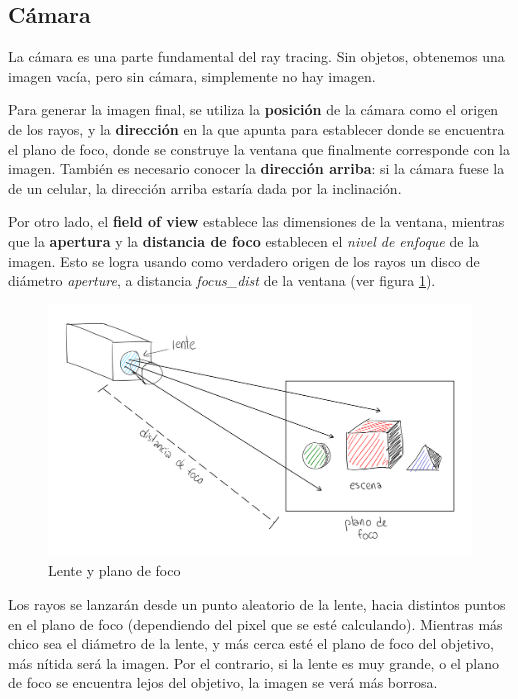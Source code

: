 \subsection{Cámara} \label{ssec:rt-camera}

La cámara es una parte fundamental del ray tracing. Sin objetos, obtenemos una
imagen vacía, pero sin cámara, simplemente no hay imagen.

Para generar la imagen final, se utiliza la \textbf{posición} de la cámara como
el origen de los rayos, y la \textbf{dirección} en la que apunta para establecer
donde se encuentra el plano de foco, donde se construye la ventana que
finalmente corresponde con la imagen. También es necesario conocer la
\textbf{dirección arriba}: si la cámara fuese la de un celular, la dirección
arriba estaría dada por la inclinación.

Por otro lado, el \textbf{field of view} establece las dimensiones de la
ventana, mientras que la \textbf{apertura} y la \textbf{distancia de foco}
establecen el \textit{nivel de enfoque} de la imagen. Esto se logra usando como
verdadero origen de los rayos un disco de diámetro \textit{aperture}, a
distancia \textit{focus\_dist} de la ventana (ver figura
\ref{fig:rt-camera-plano-foco}).

\begin{figure}[H]
  \centering
  \includegraphics[width=.7\textwidth]{imgs/rt-camera-rays-through-lens.png}
  \caption{Lente y plano de foco}
  \label{fig:rt-camera-plano-foco}
\end{figure}

Los rayos se lanzarán desde un punto aleatorio de la lente, hacia distintos
puntos en el plano de foco (dependiendo del pixel que se esté calculando).
Mientras más chico sea el diámetro de la lente, y más cerca esté el plano de
foco del objetivo, más nítida será la imagen. Por el contrario, si la lente es
muy grande, o el plano de foco se encuentra lejos del objetivo, la imagen se
verá más borrosa.

